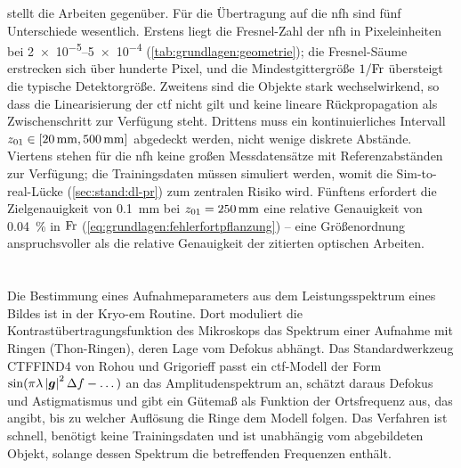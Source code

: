  stellt die Arbeiten gegenüber. Für die
Übertragung auf die \ac{nfh} sind fünf Unterschiede wesentlich. Erstens
liegt die Fresnel-Zahl der \ac{nfh} in Pixeleinheiten bei
\numrange{2e-5}{5e-4} (\cref{tab:grundlagen:geometrie}); die
Fresnel-Säume erstrecken sich über hunderte Pixel, und die
Mindestgittergröße $1/\mathrm{Fr}$ übersteigt die typische Detektorgröße. Zweitens
sind die Objekte stark wechselwirkend, so dass die Linearisierung der
\ac{ctf} nicht gilt und keine lineare Rückpropagation als Zwischenschritt
zur Verfügung steht. Drittens muss ein kontinuierliches Intervall
$z_{01} \in [\qty{20}{\milli\metre}, \qty{500}{\milli\metre}]$ abgedeckt
werden, nicht wenige diskrete Abstände. Viertens stehen für die \ac{nfh}
keine großen Messdatensätze mit Referenzabständen zur Verfügung; die
Trainingsdaten müssen simuliert werden, womit die Sim-to-real-Lücke
(\cref{sec:stand:dl-pr}) zum zentralen Risiko wird. Fünftens erfordert die
Zielgenauigkeit von \qty{0.1}{\milli\metre} bei $z_{01} = \qty{250}{\milli\metre}$
eine relative Genauigkeit von \qty{0.04}{\percent} in $\mathrm{Fr}$
(\cref{eq:grundlagen:fehlerfortpflanzung}) -- eine Größenordnung
anspruchsvoller als die relative Genauigkeit der zitierten optischen
Arbeiten.

\section{}
\label{sec:stand:spektral}

Die Bestimmung eines Aufnahmeparameters aus dem Leistungsspektrum eines
Bildes ist in der Kryo-\ac{em} Routine. Dort moduliert die
Kontrastübertragungsfunktion des Mikroskops das Spektrum einer Aufnahme mit
Ringen (Thon-Ringen), deren Lage vom Defokus abhängt. Das Standardwerkzeug
\textsc{CTFFIND4} von Rohou und Grigorieff \cite{rohou2015ctffind4} passt ein \ac{ctf}-Modell der
Form $\sin(\pi\lambda\left\lvert \bm{g} \right\rvert^2\Delta f - \dots)$ an das Amplitudenspektrum
an, schätzt daraus Defokus und Astigmatismus und gibt ein Gütemaß als
Funktion der Ortsfrequenz aus, das angibt, bis zu welcher Auflösung die
Ringe dem Modell folgen. Das Verfahren ist schnell, benötigt keine
Trainingsdaten und ist unabhängig vom abgebildeten Objekt, solange dessen
Spektrum die betreffenden Frequenzen enthält.



